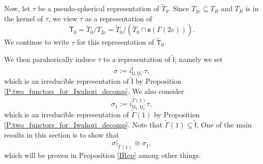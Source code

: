 \documentclass[10pt, letterpaper]{amsart}
\theoremstyle{plain}
\theoremstyle{definition}
\numberwithin{equation}{section}
\newcommand{\Kt}{\widetilde{K}}
\newcommand{\Tt}{\widetilde{T}}
\newcommand{\Gammaft}{\widetilde{\mathsf{\Gamma}}}
\newcommand{\s}{\mathbf{s}}
\newcommand{\Bf}{\mathsf{B}}
\newcommand{\Hf}{\mathsf{H}}
\newcommand{\If}{\mathsf{I}}
\newcommand{\Kf}{\mathsf{K}}
\newcommand{\Tf}{\mathsf{T}}
\newcommand{\Uf}{\mathsf{U}}
\newcommand{\Gammaf}{\mathsf{\Gamma}}
\newcommand{\Ift}{\widetilde{\mathsf{I}}}
\begin{document}

\quad

Now, let $\tau$ be a pseudo-spherical representation of $\Tt_0$. Since $T_{2e}\subseteq T_{R}$ and $T_R$ is in the kernel of $\tau$, we view $\tau$ as a representation of 
\[
\widetilde{\Tf}_0=\Tt_0\slash T_{2e}=\Tt_0\slash \left(\Tt_0\cap \s(\Gamma(2e))\right).
\]
We continue to write $\tau$ for this representation of $\widetilde{{\Tf}}_0$. 

We then parahorically induce $\tau$ to a representation of $\widetilde{\If}$; namely we set
\[
\sigma:=i_{{\Uf},{\Uf}^{-}_{1}}^{\Ift}\tau,
\]
which is an irreducible representation of $\widetilde{{\If}}$ by Proposition \ref{P:two_functors_for_Iwahori_decomp}. We also consider 
\[
\sigma_{1}:=i_{{\Uf}_{1},{\Uf}^{-}_{1}}^{\Gammaft(1)}\tau,
\]
which is an irreducible representation of $\widetilde{\Gammaf}(1)$ by Proposition \ref{P:two_functors_for_Iwahori_decomp}. Note that $\widetilde{\Gammaf}(1)\subseteq\widetilde{\If}$. One of the main results in this section is to show that
\[
\sigma|_{\widetilde{\Gammaf}(1)}\cong\sigma_1,
\]
which will be proven in Proposition \ref{IRep} among other things. 
\end{document}
